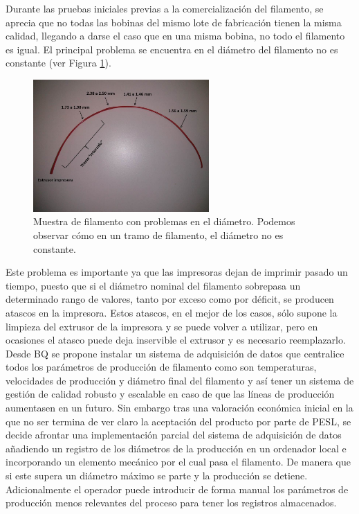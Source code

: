 Durante las pruebas iniciales previas a la comercialización del filamento, se aprecia que no todas las bobinas del mismo lote de fabricación tienen la misma calidad, llegando a darse el caso que en una misma bobina, no todo el filamento es igual. El principal problema se encuentra en el diámetro del filamento no es constante (ver Figura \ref{fig:muestra_filamento}).

\begin{figure}[!ht]
    \centering
    \includegraphics[width=0.6\textwidth]{images/atasco_rojo.jpg}
    \caption[Muestra de filamento con problemas en el diámetro]{Muestra de filamento con problemas en el diámetro. Podemos observar cómo en un tramo de filamento, el diámetro no es constante.}
    \label{fig:muestra_filamento}
\end{figure}

Este problema es importante ya que las impresoras dejan de imprimir pasado un tiempo, puesto que si el diámetro nominal del filamento sobrepasa un determinado rango de valores, tanto por exceso como por déficit, se producen atascos en la impresora. Estos atascos, en el mejor de los casos, sólo supone la limpieza del extrusor de la impresora y se puede volver a utilizar, pero en ocasiones el atasco puede deja inservible el extrusor y es necesario reemplazarlo.\\

Desde BQ se propone instalar un sistema de adquisición de datos que centralice todos los parámetros de producción de filamento como son temperaturas, velocidades de producción y diámetro final del filamento y así tener un sistema de gestión de calidad robusto y escalable en caso de que las líneas de producción aumentasen en un futuro. Sin embargo tras una valoración económica inicial en la que no ser termina de ver claro la aceptación del producto por parte de PESL, se decide afrontar una implementación parcial del sistema de adquisición de datos añadiendo un registro de los diámetros de la producción en un ordenador local e incorporando un elemento mecánico por el cual pasa el filamento. De manera que si este supera un diámetro máximo se parte y la producción se detiene. Adicionalmente el operador puede introducir de forma manual los parámetros de producción menos relevantes del proceso para tener los registros almacenados.\\

